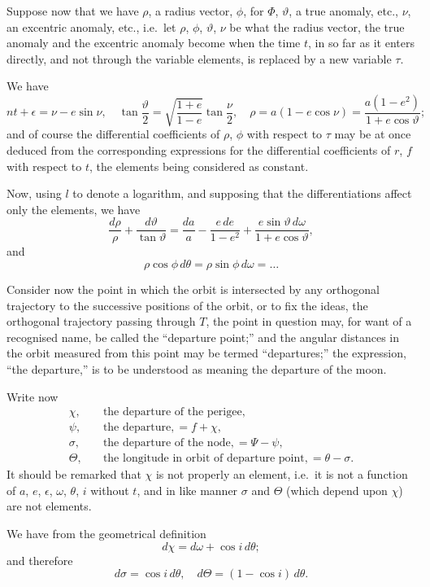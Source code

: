 \documentclass[11pt,a4paper]{book}
\begin{document}
Suppose now that we have $\rho$, a radius vector, $\phi$, for $\Phi$, $\vartheta$, a true anomaly, etc., $\nu$, an excentric anomaly, etc., i.e.\ let $\rho$, $\phi$, $\vartheta$, $\nu$ be what the radius vector, the true anomaly and the excentric anomaly become when the time $t$, in so far as it enters directly, and not through the variable elements, is replaced by a new variable $\tau$.

We have
\[
nt + \epsilon = \nu - e\sin\nu, \quad \tan\frac{\vartheta}{2} = \sqrt{\frac{1+e}{1-e}}\tan\frac{\nu}{2}, \quad \rho = a(1-e\cos\nu) = \frac{a(1-e^2)}{1+e\cos\vartheta};
\]
and of course the differential coefficients of $\rho$, $\phi$ with respect to $\tau$ may be at once deduced from the corresponding expressions for the differential coefficients of $r$, $f$ with respect to $t$, the elements being considered as constant.

Now, using $l$ to denote a logarithm, and supposing that the differentiations affect only the elements, we have
\[
\frac{d\rho}{\rho} + \frac{d\vartheta}{\tan\vartheta} = \frac{da}{a} - \frac{e\, de}{1-e^2} + \frac{e\sin\vartheta\, d\omega}{1+e\cos\vartheta},
\]
and
\[
\rho\cos\phi\, d\theta = \rho\sin\phi\, d\omega = \ldots
\]

Consider now the point in which the orbit is intersected by any orthogonal trajectory to the successive positions of the orbit, or to fix the ideas, the orthogonal trajectory passing through $T$, the point in question may, for want of a recognised name, be called the ``departure point;'' and the angular distances in the orbit measured from this point may be termed ``departures;'' the expression, ``the departure,'' is to be understood as meaning the departure of the moon.

Write now
\begin{align*}
\chi, \quad &\text{the departure of the perigee}, \\
\psi, \quad &\text{the departure}, = f + \chi, \\
\sigma, \quad &\text{the departure of the node}, = \Psi - \psi, \\
\Theta, \quad &\text{the longitude in orbit of departure point}, = \theta - \sigma.
\end{align*}
It should be remarked that $\chi$ is not properly an element, i.e.\ it is not a function of $a$, $e$, $\epsilon$, $\omega$, $\theta$, $i$ without $t$, and in like manner $\sigma$ and $\Theta$ (which depend upon $\chi$) are not elements.

We have from the geometrical definition
\[
d\chi = d\omega + \cos i\, d\theta;
\]
and therefore
\[
d\sigma = \cos i\, d\theta, \quad d\Theta = (1-\cos i)\, d\theta.
\]
\end{document}
